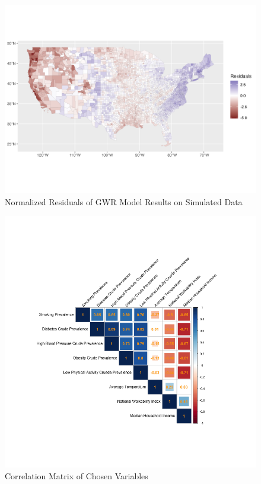 \documentclass[
]{article}
\begin{document}
\begin{figure}[H]

{\centering \includegraphics{sim_residual_plot.png}

}

\caption{Normalized Residuals of GWR Model Results on Simulated Data}

\end{figure}%
\begin{figure}[H]

{\centering \includegraphics{correlation_plot.png}

}

\caption{Correlation Matrix of Chosen Variables}

\end{figure}%
\end{document}
